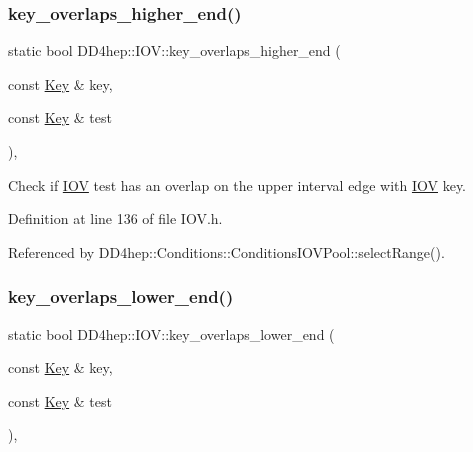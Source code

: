 \subsubsection{\texorpdfstring{key\+\_\+overlaps\+\_\+higher\+\_\+end()}{key\_overlaps\_higher\_end()}}
{\footnotesize\ttfamily static bool D\+D4hep\+::\+I\+O\+V\+::key\+\_\+overlaps\+\_\+higher\+\_\+end (\begin{DoxyParamCaption}\item[{const \hyperlink{class_d_d4hep_1_1_i_o_v_a07cb46dc875296dc9cccf4ff370104ae}{Key} \&}]{key,  }\item[{const \hyperlink{class_d_d4hep_1_1_i_o_v_a07cb46dc875296dc9cccf4ff370104ae}{Key} \&}]{test }\end{DoxyParamCaption})\hspace{0.3cm}{\ttfamily [inline]}, {\ttfamily [static]}}



Check if \hyperlink{class_d_d4hep_1_1_i_o_v}{I\+OV} \textquotesingle{}test\textquotesingle{} has an overlap on the upper interval edge with \hyperlink{class_d_d4hep_1_1_i_o_v}{I\+OV} \textquotesingle{}key\textquotesingle{}. 



Definition at line 136 of file I\+O\+V.\+h.



Referenced by D\+D4hep\+::\+Conditions\+::\+Conditions\+I\+O\+V\+Pool\+::select\+Range().

\hypertarget{class_d_d4hep_1_1_i_o_v_a6354b88d28e4e57bd50a02d9d4df7653}{}\label{class_d_d4hep_1_1_i_o_v_a6354b88d28e4e57bd50a02d9d4df7653} 
\subsubsection{\texorpdfstring{key\+\_\+overlaps\+\_\+lower\+\_\+end()}{key\_overlaps\_lower\_end()}}
{\footnotesize\ttfamily static bool D\+D4hep\+::\+I\+O\+V\+::key\+\_\+overlaps\+\_\+lower\+\_\+end (\begin{DoxyParamCaption}\item[{const \hyperlink{class_d_d4hep_1_1_i_o_v_a07cb46dc875296dc9cccf4ff370104ae}{Key} \&}]{key,  }\item[{const \hyperlink{class_d_d4hep_1_1_i_o_v_a07cb46dc875296dc9cccf4ff370104ae}{Key} \&}]{test }\end{DoxyParamCaption})\hspace{0.3cm}{\ttfamily [inline]}, {\ttfamily [static]}}



